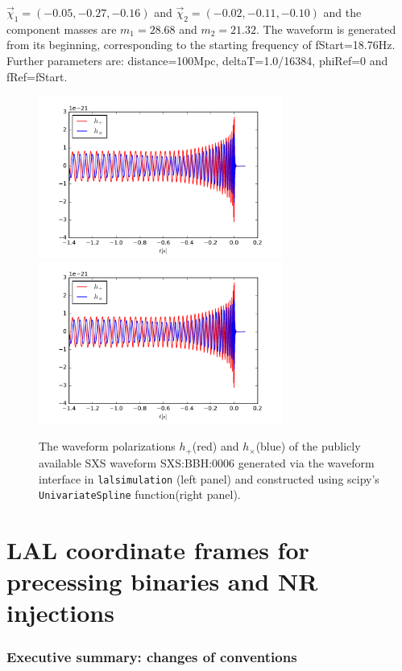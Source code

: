 \documentclass[11pt,tightenlines,article,amssymb,amsmath,amsfonts,superscriptaddress,nofootinbib]{revtex4}
\begin{document}
$\vec{\chi}_1=(-0.05, -0.27, -0.16)$ and $\vec{\chi}_2=(-0.02, -0.11, -0.10)$ and the component masses are $m_1=28.68$ and $m_2=21.32$. The waveform is generated from its beginning, corresponding to the starting frequency of fStart=18.76Hz.
Further parameters are: distance=100Mpc, deltaT=1.0/16384, phiRef=0 and fRef=fStart.
\begin{figure}
\begin{center}
\includegraphics[width=80mm]{lalsim_SXS6.pdf}
\includegraphics[width=80mm]{pycbc_SXS6.pdf}
\caption{The waveform polarizations $h_+$(red) and $h_\times$(blue) of the publicly available SXS waveform SXS:BBH:0006
generated via the waveform interface in \texttt{lalsimulation} (left panel)
and constructed using scipy's \texttt{UnivariateSpline} function(right panel). }
\label{fig:waveforms}
\end{center}
\end{figure}

\section{LAL coordinate frames for precessing binaries and NR injections}
\label{sec:coordinates}

\subsubsection{Executive summary: changes of conventions}
\end{document}
